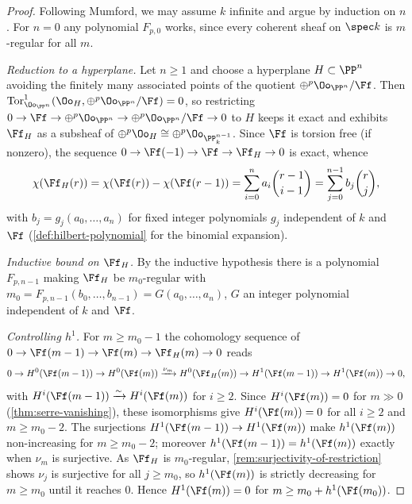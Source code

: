 \begin{proof}
  Following Mumford, we may assume $k$ infinite and argue by induction on $n$.
  For $n=0$ any polynomial $F_{p,0}$ works, since every coherent sheaf on
  $\spec k$ is $m$-regular for all $m$.

  \emph{Reduction to a hyperplane.} Let $n\ge1$ and choose a hyperplane
  $H\subset\PP^n$ avoiding the finitely many associated points of the quotient
  $\oplus^p\Oo_{\PP^n}/\Ff$. Then $\mathrm{Tor}^1_{\Oo_{\PP^n}}(\Oo_H,
  \oplus^p\Oo_{\PP^n}/\Ff) = 0$, so restricting
  $0\to\Ff\to\oplus^p\Oo_{\PP^n}\to\oplus^p\Oo_{\PP^n}/\Ff\to0$ to $H$ keeps it
  exact and exhibits $\Ff_H$ as a subsheaf of $\oplus^p\Oo_{H}\cong
  \oplus^p\Oo_{\PP^{n-1}_k}$. Since $\Ff$ is torsion free (if nonzero), the
  sequence $0\to\Ff(-1)\to\Ff\to\Ff_H\to0$ is exact, whence
  \[
    \chi(\Ff_H(r)) = \chi(\Ff(r))-\chi(\Ff(r-1))
      = \sum_{i=0}^n a_i\binom{r-1}{i-1} = \sum_{j=0}^{n-1} b_j\binom{r}{j},
  \]
  with $b_j = g_j(a_0,\dots,a_n)$ for fixed integer polynomials $g_j$
  independent of $k$ and $\Ff$ (\cref{def:hilbert-polynomial} for the binomial
  expansion).

  \emph{Inductive bound on $\Ff_H$.} By the inductive hypothesis there is a
  polynomial $F_{p,n-1}$ making $\Ff_H$ be $m_0$-regular with
  $m_0 = F_{p,n-1}(b_0,\dots,b_{n-1}) = G(a_0,\dots,a_n)$, $G$ an integer
  polynomial independent of $k$ and $\Ff$.

  \emph{Controlling $h^1$.} For $m\ge m_0-1$ the cohomology sequence of
  $0\to\Ff(m-1)\to\Ff(m)\to\Ff_H(m)\to0$ reads
  \[
    0\to H^0(\Ff(m-1))\to H^0(\Ff(m))\xrightarrow{\nu_m} H^0(\Ff_H(m))
      \to H^1(\Ff(m-1))\to H^1(\Ff(m))\to0,
  \]
  with $H^i(\Ff(m-1))\xrightarrow{\sim}H^i(\Ff(m))$ for $i\ge2$. Since
  $H^i(\Ff(m))=0$ for $m\gg0$ (\cref{thm:serre-vanishing}), these isomorphisms
  give $H^i(\Ff(m))=0$ for all $i\ge2$ and $m\ge m_0-2$. The surjections
  $H^1(\Ff(m-1))\to H^1(\Ff(m))$ make $h^1(\Ff(m))$ non-increasing for
  $m\ge m_0-2$; moreover $h^1(\Ff(m-1))=h^1(\Ff(m))$ exactly when $\nu_m$ is
  surjective. As $\Ff_H$ is $m_0$-regular, \cref{rem:surjectivity-of-restriction}
  shows $\nu_j$ is surjective for all $j\ge m_0$, so $h^1(\Ff(m))$ is strictly
  decreasing for $m\ge m_0$ until it reaches $0$. Hence
  $H^1(\Ff(m))=0$ for $m\ge m_0 + h^1(\Ff(m_0))$.


\end{proof}

